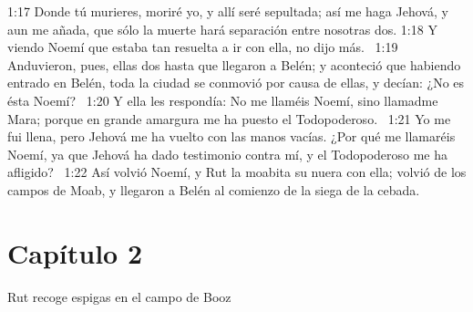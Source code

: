 1:17 Donde tú murieres, moriré yo, y allí seré sepultada; así me haga Jehová, y aun me añada, que sólo la muerte hará separación entre nosotras dos. 
1:18 Y viendo Noemí que estaba tan resuelta a ir con ella, no dijo más.  
1:19 Anduvieron, pues, ellas dos hasta que llegaron a Belén; y aconteció que habiendo entrado en Belén, toda la ciudad se conmovió por causa de ellas, y decían: ¿No es ésta Noemí?  
1:20 Y ella les respondía: No me llaméis Noemí, sino llamadme Mara; porque en grande amargura me ha puesto el Todopoderoso.  
1:21 Yo me fui llena, pero Jehová me ha vuelto con las manos vacías. ¿Por qué me llamaréis Noemí, ya que Jehová ha dado testimonio contra mí, y el Todopoderoso me ha afligido?  
1:22 Así volvió Noemí, y Rut la moabita su nuera con ella; volvió de los campos de Moab, y llegaron a Belén al comienzo de la siega de la cebada.  
\section*{Capítulo 2}
Rut recoge espigas en el campo de Booz  

